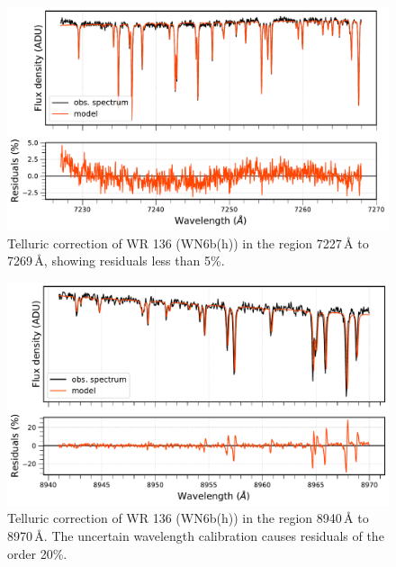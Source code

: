 \begin{figure}
    \centering
    \includegraphics[width=\hsize]{chapters/data_reduction/image/tell_corr_7227_7268.pdf}
    \caption{Telluric correction of WR 136 (WN6b(h)) in the region 7227\,\r{A} to 7269\,\r{A}, showing residuals less than 5\%.}
    \label{fig:tell_corr_7227}
\end{figure}

\begin{figure}
    \centering
    \includegraphics[width=\hsize]{chapters/data_reduction/image/tell_corr_8940_8970.pdf}
    \caption{Telluric correction of WR 136 (WN6b(h)) in the region 8940\,\r{A} to 8970\,\r{A}. The uncertain wavelength calibration causes residuals of the order  20\%.}
    \label{fig:tell_corr_8940}
\end{figure}

